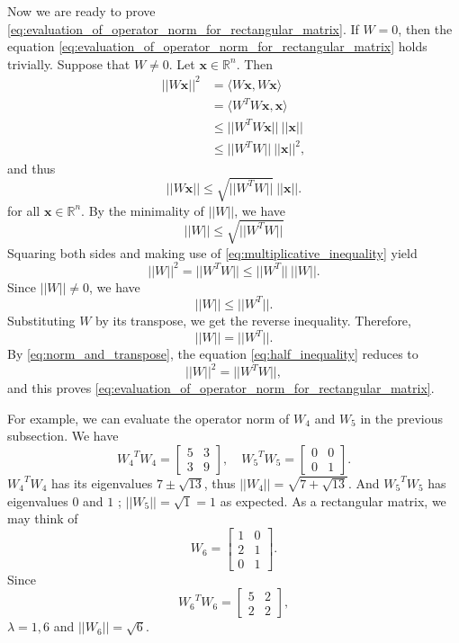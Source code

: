 \documentclass[11pt]{report}
\newcommand\bx{\ensuremath{\boldsymbol x}}
\begin{document}
Now we are ready to prove \eqref{eq:evaluation_of_operator_norm_for_rectangular_matrix}.
If \(W=0\), then the equation \eqref{eq:evaluation_of_operator_norm_for_rectangular_matrix} holds trivially.
Suppose that \(W\neq0\).
Let \(\bx\in\mathbb R^n\).
Then
\begin{align*}
||W\bx||^2
&=\langle W\bx,W\bx\rangle\\
&=\langle W^TW\bx,\bx\rangle\\
&\le||W^TW\bx||\:||\bx||\\
&\le||W^TW||\:||\bx||^2,
\end{align*}
and thus
\[||W\bx||\le\sqrt{||W^TW||}\:||\bx||.\]
for all \(\bx\in\mathbb R^n\).
By the minimality of \(||W||\), we have
\[||W||\le\sqrt{||W^TW||}\]
Squaring both sides and making use of \eqref{eq:multiplicative_inequality} yield
\begin{equation}\label{eq:half_inequality}
||W||^2=||W^TW||\le||W^T||\:||W||.
\end{equation}
Since \(||W||\neq0\), we have
\[||W||\le||W^T||.\]
Substituting \(W\) by its transpose, we get the reverse inequality.
Therefore,
\begin{equation}\label{eq:norm_and_transpose}
||W||=||W^T||.
\end{equation}
By \eqref{eq:norm_and_transpose}, the equation \eqref{eq:half_inequality} reduces to
\[||W||^2=||W^TW||,\]
and this proves \eqref{eq:evaluation_of_operator_norm_for_rectangular_matrix}.

For example, we can evaluate the operator norm of \(W_4\) and \(W_5\) in the previous subsection.
We have
\[{W_4}^TW_4=\begin{bmatrix}5&3\\3&9\end{bmatrix},\quad{W_5}^TW_5=\begin{bmatrix}0&0\\0&1\end{bmatrix}.\]
\({W_4}^TW_4\) has its eigenvalues \(7\pm\sqrt{13}\), thus \(||W_4||=\sqrt{7+\sqrt{13}}\).
And \({W_5}^TW_5\) has eigenvalues \(0\) and \(1\) ; \(||W_5||=\sqrt1=1\) as expected.
As a rectangular matrix, we may think of
\[W_6=\begin{bmatrix}1&0\\2&1\\0&1\end{bmatrix}.\]
Since
\[{W_6}^TW_6=\begin{bmatrix}5&2\\2&2\end{bmatrix},\]
\(\lambda=1,6\) and \(||W_6||=\sqrt6\).
\end{document}
